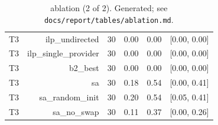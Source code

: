 \begin{table}[t]
\begin{tabular}{lrrrrr}
T3 & ilp\_undirected & 30 & 0.00 & 0.00 & [0.00, 0.00] \\
T3 & ilp\_single\_provider & 30 & 0.00 & 0.00 & [0.00, 0.00] \\
T3 & b2\_best & 30 & 0.00 & 0.00 & [0.00, 0.00] \\
T3 & sa & 30 & 0.18 & 0.54 & [0.00, 0.41] \\
T3 & sa\_random\_init & 30 & 0.20 & 0.54 & [0.05, 0.41] \\
T3 & sa\_no\_swap & 30 & 0.11 & 0.37 & [0.00, 0.26] \\
\bottomrule
\end{tabular}
\caption{ablation (2 of 2). Generated; see \texttt{docs/report/tables/ablation.md}.}
\label{tab:ablation-2}
\end{table}
